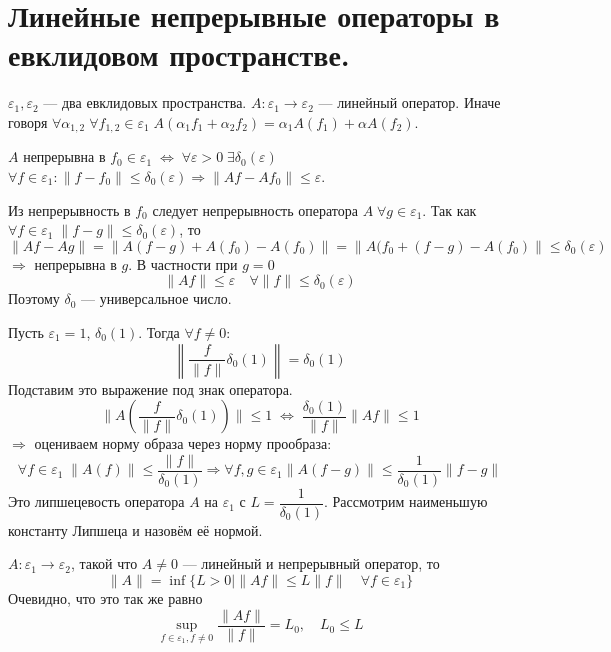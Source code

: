 \documentclass[14pt]{extarticle}
\begin{document}
\section*{Линейные непрерывные операторы в евклидовом пространстве.}

$\varepsilon_1, \varepsilon_2$ --- два евклидовых пространства.
$A : \varepsilon_1 \to \varepsilon_2$ --- линейный оператор.
Иначе говоря $\forall \alpha_{1, 2}\; \forall f_{1, 2} \in \varepsilon_1\; A(\alpha_1 f_1 + \alpha_2 f_2) = \alpha_1 A(f_1) + \alpha A(f_2)$.

\begin{Opr}
    $A$ непрерывна в $f_0 \in \varepsilon_1\; \Leftrightarrow\; \forall \varepsilon > 0\; \exists \delta_0(\varepsilon)$
    $\forall f \in \varepsilon_1\colon \|f - f_0\| \le \delta_0(\varepsilon) \Rightarrow  \|Af-Af_0\| \le \varepsilon$.
\end{Opr}

Из непрерывность в $f_0$ следует непрерывность оператора $A\; \forall g \in \varepsilon_1$.
Так как $\forall f \in \varepsilon_1\; \|f - g\| \le \delta_0(\varepsilon)$, то 
$$
\|Af - Ag\| = \|A(f - g) + A(f_0) - A(f_0)\| = \|A(f_0 + (f - g)
- A(f_0)\| \le \delta_0(\varepsilon)
$$
$\Rightarrow$ непрерывна в $g$.
В частности при $g = 0$
$$
\|Af\| \le \varepsilon\quad \forall \|f\| \le \delta_0(\varepsilon)
$$
Поэтому $\delta_0$ --- универсальное число.

Пусть $\varepsilon_1 = 1$, $\delta_0(1)$.
Тогда $\forall f \ne 0$:
$$
\left \| \dfrac{f}{\|f\|}\delta_0(1)\right \| = \delta_0(1)
$$
Подставим это выражение под знак оператора.
$$
\|A(\dfrac{f}{\|f\|}\delta_0(1))\| \le 1\; \Leftrightarrow\; \dfrac{\delta_0(1)}{\|f\|}\|Af\| \le 1
$$
$\Rightarrow$ оцениваем норму образа через норму
прообраза:
$$
\forall f \in \varepsilon_1\; \|A(f)\| \le \dfrac{\|f\|}{\delta_0(1)} \Rightarrow  \forall f,g \in \varepsilon_1 \|A(f-g)\| \le \dfrac{1}{\delta_0(1)}\|f - g\|
$$
Это липшецевость оператора $A$ на $\varepsilon_1$ с $L=\dfrac{1}{\delta_0(1)}$.
Рассмотрим наименьшую константу Липшеца и назовём её нормой.


\begin{Opr}
    $A : \varepsilon_1 \to \varepsilon_2$, такой что $A \ne 0$ --- линейный и непрерывный оператор, то
    $$
    \|A\| = \inf\{L > 0 \mid \|Af\| \le L\|f\| \quad \forall f \in \varepsilon_1\}
    $$
    Очевидно, что это так же равно
    $$
    \sup\limits_{f \in \varepsilon_1, f \ne 0} \dfrac {\|Af\|}{\|f\|}=L_0,\quad L_0 \le L
    $$
\end{Opr}
\end{document}
